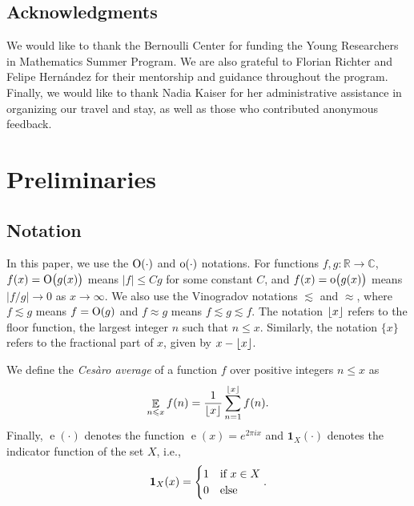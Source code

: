 \documentclass[letterpaper, 12pt]{article}
\theoremstyle{plain}
\theoremstyle{definition}
\theoremstyle{plain}
\theoremstyle{plain}
\numberwithin{equation}{section}
\newcommand{\Cesaro}{Ces\`{a}ro}
\newcommand{\Oh}{{\rm O}}
\newcommand{\oh}{{\rm o}}
\newcommand{\R}{\mathbb{R}}
\newcommand{\C}{\mathbb{C}}
\newcommand{\define}[1]{{\itshape #1}}
\renewcommand{\leq}{\leqslant}
\newcommand{\E}{\mathbb{E}}
\newcommand{\1}{\textbf{1}}
\DeclarePairedDelimiter\floor{\lfloor}{\rfloor}
\DeclareMathOperator{\e}{e}
\begin{document}
\subsection{Acknowledgments}
We would like to thank the Bernoulli Center for funding the Young Researchers in Mathematics Summer Program. We are also grateful to Florian Richter and Felipe Hern{\'a}ndez for their mentorship and guidance throughout the program. Finally, we would like to thank Nadia Kaiser for her administrative assistance in organizing our travel and stay, as well as those who contributed anonymous feedback.

\section{Preliminaries}

\subsection{Notation}\label{notation}

\hspace{20pt} In this paper, we use the $\Oh(\cdot)$ and $\oh(\cdot)$ notations. For functions $f, g \colon \R \to \C$, $f(x) = \Oh\bigl(g(x)\bigr)$ means $\lvert f \rvert \leq Cg$ for some constant $C$, and $f(x) = \oh\bigl(g(x)\bigr)$ means $\lvert f/g \rvert \to 0$ as $x \to \infty$. We also use the Vinogradov notations $\lesssim$ and $\approx$, where $f \lesssim g$ means $f = \Oh(g)$ and $f \approx g$ means $f \lesssim g \lesssim f$. The notation $\floor{x}$ refers to the floor function, the largest integer $n$ such that $n \leq x$. Similarly, the notation $\{x\}$ refers to the fractional part of $x$, given by $x - \floor{x}$.

We define the \define{\Cesaro{} average} of a function $f$ over positive integers $n \leq x$ as 
\begin{equation}\label{def:cesaro}
    \mathop{\E}_{n \leq x} f(n) = \frac{1}{\floor{x}} \sum_{n = 1}^{\floor{x}} f(n).
\end{equation}
Finally, \(\e(\cdot)\) denotes the function \(\e(x) = e^{2 \pi i x}\) and \(\1_{X}(\cdot)\) denotes the indicator function of the set \(X\), i.e.,
\[
    \1_{X}(x) = \begin{cases}
        1 &\text{if } x \in X\\
        \hfil 0 &\text{else}
    \end{cases}.
\]
\end{document}
